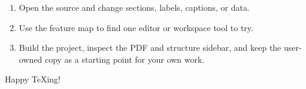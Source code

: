 \documentclass[11pt]{article}
\theoremstyle{definition}
\theoremstyle{plain}
\begin{document}
\begin{enumerate}[noitemsep]
    \item Open the source and change sections, labels, captions, or data.
    \item Use the feature map to find one editor or workspace tool to try.
    \item Build the project, inspect the PDF and structure sidebar, and keep
          the user-owned copy as a starting point for your own work.
\end{enumerate}

Happy \TeX ing!

\appendix




\end{document}
